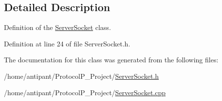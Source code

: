 \subsection{Detailed Description}
Definition of the \hyperlink{classServerSocket}{Server\-Socket} class. 

Definition at line 24 of file Server\-Socket.\-h.



The documentation for this class was generated from the following files\-:\begin{DoxyCompactItemize}
\item 
/home/antipant/\-Protocol\-P\-\_\-\-Project/\hyperlink{ServerSocket_8h}{Server\-Socket.\-h}\item 
/home/antipant/\-Protocol\-P\-\_\-\-Project/\hyperlink{ServerSocket_8cpp}{Server\-Socket.\-cpp}\end{DoxyCompactItemize}
